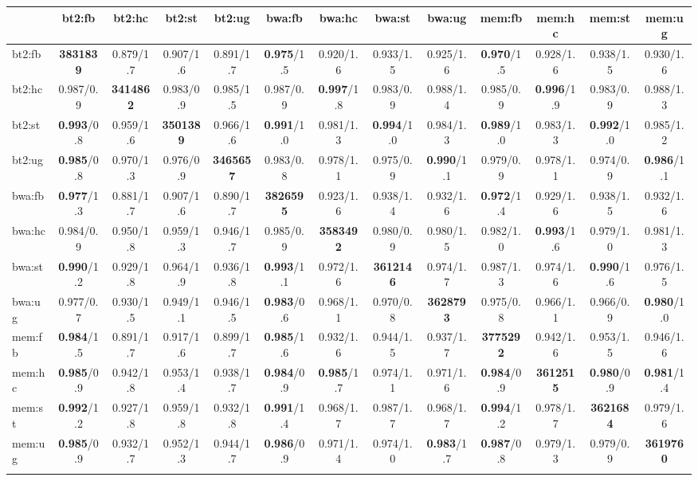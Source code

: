 \documentclass{bioinfo}
\begin{document}
\begin{table*}
{\begin{tabular*}{\textwidth}{@{\extracolsep{\fill}}lcccccccccccc}
\toprule
 & bt2:fb & bt2:hc & bt2:st & bt2:ug & bwa:fb & bwa:hc & bwa:st & bwa:ug & mem:fb & mem:hc & mem:st & mem:ug \\
\midrule
bt2:fb & {\bf 3831839} & 0.879/1.7 & 0.907/1.6 & 0.891/1.7 & {\bf 0.975}/1.5 & 0.920/1.6 & 0.933/1.5 & 0.925/1.6 & {\bf 0.970}/1.5 & 0.928/1.6 & 0.938/1.5 & 0.930/1.6 \\
bt2:hc & 0.987/0.9 & {\bf 3414862} & 0.983/0.9 & 0.985/1.5 & 0.987/0.9 & {\bf 0.997}/1.8 & 0.983/0.9 & 0.988/1.4 & 0.985/0.9 & {\bf 0.996}/1.9 & 0.983/0.9 & 0.988/1.3 \\
bt2:st & {\bf 0.993}/0.8 & 0.959/1.6 & {\bf 3501389} & 0.966/1.6 & {\bf 0.991}/1.0 & 0.981/1.3 & {\bf 0.994}/1.0 & 0.984/1.3 & {\bf 0.989}/1.0 & 0.983/1.3 & {\bf 0.992}/1.0 & 0.985/1.2 \\
bt2:ug & {\bf 0.985}/0.8 & 0.970/1.3 & 0.976/0.9 & {\bf 3465657} & 0.983/0.8 & 0.978/1.1 & 0.975/0.9 & {\bf 0.990}/1.1 & 0.979/0.9 & 0.978/1.1 & 0.974/0.9 & {\bf 0.986}/1.1 \\
bwa:fb & {\bf 0.977}/1.3 & 0.881/1.7 & 0.907/1.6 & 0.890/1.7 & {\bf 3826595} & 0.923/1.6 & 0.938/1.4 & 0.932/1.6 & {\bf 0.972}/1.4 & 0.929/1.6 & 0.938/1.5 & 0.932/1.6 \\
bwa:hc & 0.984/0.9 & 0.950/1.8 & 0.959/1.3 & 0.946/1.7 & 0.985/0.9 & {\bf 3583492} & 0.980/0.9 & 0.980/1.5 & 0.982/1.0 & {\bf 0.993}/1.6 & 0.979/1.0 & 0.981/1.3 \\
bwa:st & {\bf 0.990}/1.2 & 0.929/1.8 & 0.964/1.9 & 0.936/1.8 & {\bf 0.993}/1.1 & 0.972/1.6 & {\bf 3612146} & 0.974/1.7 & 0.987/1.3 & 0.974/1.6 & {\bf 0.990}/1.6 & 0.976/1.5 \\
bwa:ug & 0.977/0.7 & 0.930/1.5 & 0.949/1.1 & 0.946/1.5 & {\bf 0.983}/0.6 & 0.968/1.1 & 0.970/0.8 & {\bf 3628793} & 0.975/0.8 & 0.966/1.1 & 0.966/0.9 & {\bf 0.980}/1.0 \\
mem:fb & {\bf 0.984}/1.5 & 0.891/1.7 & 0.917/1.6 & 0.899/1.7 & {\bf 0.985}/1.6 & 0.932/1.6 & 0.944/1.5 & 0.937/1.7 & {\bf 3775292} & 0.942/1.6 & 0.953/1.5 & 0.946/1.6 \\
mem:hc & {\bf 0.985}/0.9 & 0.942/1.8 & 0.953/1.4 & 0.938/1.7 & {\bf 0.984}/0.9 & {\bf 0.985}/1.7 & 0.974/1.1 & 0.971/1.6 & {\bf 0.984}/0.9 & {\bf 3612515} & {\bf 0.980}/0.9 & {\bf 0.981}/1.4 \\
mem:st & {\bf 0.992}/1.2 & 0.927/1.8 & 0.959/1.8 & 0.932/1.8 & {\bf 0.991}/1.4 & 0.968/1.7 & 0.987/1.7 & 0.968/1.7 & {\bf 0.994}/1.2 & 0.978/1.7 & {\bf 3621684} & 0.979/1.6 \\
mem:ug & {\bf 0.985}/0.9 & 0.932/1.7 & 0.952/1.3 & 0.944/1.7 & {\bf 0.986}/0.9 & 0.971/1.4 & 0.974/1.0 & {\bf 0.983}/1.7 & {\bf 0.987}/0.8 & 0.979/1.3 & 0.979/0.9 & {\bf 3619760} \\
\botrule
\end{tabular*}}{}
\end{table*}
\end{document}
